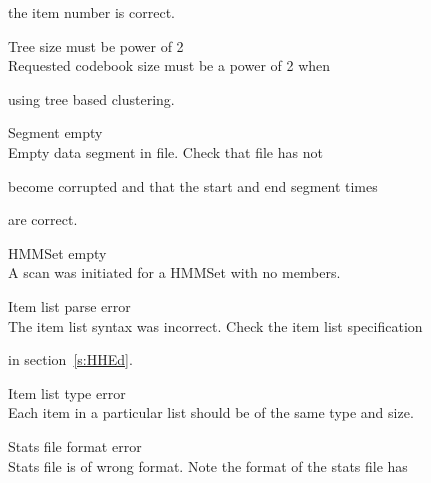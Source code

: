 \begin{itemize}
\begin{itemize}
        the item number is correct.





    Tree size must be power of 2\\


        Requested codebook size must be a power of 2 when


        using tree based clustering.





    Segment empty\\


        Empty data segment in file. Check that file has not


        become corrupted and that the start and end segment times


        are correct.





\end{itemize}










\begin{itemize}


    HMMSet empty\\


        A scan was initiated for a HMMSet with no members.





    Item list parse error\\


        The item list syntax was incorrect.  Check the item list specification


        in section~\ref{s:HHEd}.





    Item list type error\\


        Each item in a particular list should be of the same type and size.





    Stats file format error\\


        Stats file is of wrong format.  Note the format of the stats file has 



\end{itemize}
\end{itemize}
